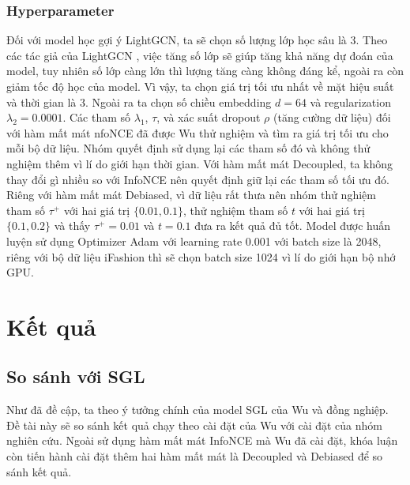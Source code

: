 \subsubsection{Hyperparameter}
\noindent Đối với model học gợi ý LightGCN, ta sẽ chọn số lượng lớp học sâu là 3. Theo các tác giả của LightGCN \cite{LightGCN}, việc tăng số lớp sẽ giúp tăng khả năng dự đoán của model, tuy nhiên số lớp càng lớn thì lượng tăng càng không đáng kể, ngoài ra còn giảm tốc độ học của model. Vì vậy, ta chọn giá trị tối ưu nhất về mặt hiệu suất và thời gian là 3. Ngoài ra ta chọn số chiều embedding $d = 64$ và regularization $\lambda_2 = 0.0001$. Các tham số $\lambda_1$, $\tau$, và xác suất dropout $\rho$ (tăng cường dữ liệu) đối với hàm mất mát nfoNCE đã được Wu \cite{SGL} thử nghiệm và tìm ra giá trị tối ưu cho mỗi bộ dữ liệu. Nhóm quyết định sử dụng lại các tham số đó và không thử nghiệm thêm vì lí do giới hạn thời gian. Với hàm mất mát Decoupled, ta không thay đổi gì nhiều so với InfoNCE nên quyết định giữ lại các tham số tối ưu đó. Riêng với hàm mất mát Debiased, vì dữ liệu rất thưa nên nhóm thử nghiệm tham số $\tau^+$ với hai giá trị $\{0.01, 0.1\}$, thử nghiệm tham số $t$ với hai giá trị $\{0.1, 0.2\}$ và thấy $\tau^+ = 0.01$ và $t = 0.1$ đưa ra kết quả đủ tốt. Model được huấn luyện sử dụng Optimizer Adam với learning rate 0.001 với batch size là 2048, riêng với bộ dữ liệu iFashion thì sẽ chọn batch size 1024 vì lí do giới hạn bộ nhớ GPU.

\section{Kết quả}

\subsection{So sánh với SGL}
\noindent Như đã đề cập, ta theo ý tưởng chính của model SGL \cite{SGL} của Wu và đồng nghiệp. Đề tài này sẽ so sánh kết quả chạy theo cài đặt của Wu với cài đặt của nhóm nghiên cứu. Ngoài sử dụng hàm mất mát InfoNCE mà Wu đã cài đặt, khóa luận còn tiến hành cài đặt thêm hai hàm mất mát là Decoupled và Debiased để so sánh kết quả.

